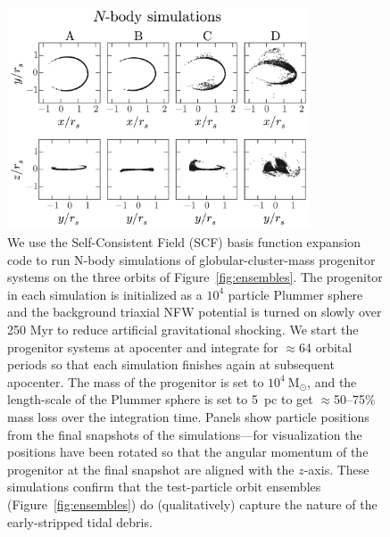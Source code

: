 \documentclass[letterpaper,12pt,preprint]{aastex}
\newcommand{\msun}{\ensuremath{\mathrm{M}_\odot}}
\begin{document}
\begin{figure}[h]%
\begin{center}
\includegraphics[width=0.8\textwidth]{figures/nbody.pdf}
\caption{ We use the Self-Consistent Field (SCF) basis function expansion code \citep{hernquist92} to run N-body simulations of globular-cluster-mass progenitor systems on the three orbits of Figure~\ref{fig:ensembles}. The progenitor in each simulation is initialized as a $10^4$ particle Plummer sphere and the background triaxial NFW potential is turned on slowly over 250 Myr to reduce artificial gravitational shocking. We start the progenitor systems at apocenter and integrate for $\approx$64 orbital periods so that each simulation finishes again at subsequent apocenter. The mass of the progenitor is set to $10^4~\msun$, and the length-scale of the Plummer sphere is set to 5~pc to get $\approx$50--75\% mass loss over the integration time. Panels show particle positions from the final snapshots of the simulations---for visualization the positions have been rotated so that the angular momentum of the progenitor at the final snapshot are aligned with the $z$-axis. These simulations confirm that the test-particle orbit ensembles (Figure~\ref{fig:ensembles}) do (qualitatively) capture the nature of the early-stripped tidal debris. }
\label{fig:nbodysims}
\end{center}
\end{figure}
\end{document}
